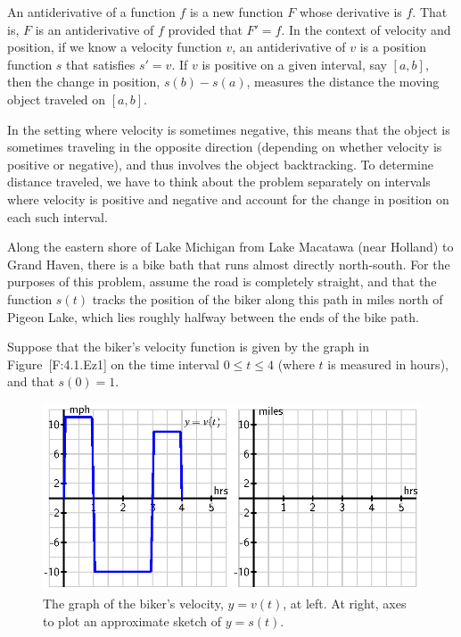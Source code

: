 An antiderivative of a function \(f\) is a new function \(F\) whose
derivative is \(f\). That is, \(F\) is an antiderivative of \(f\)
provided that \(F' = f\). In the context of velocity and position, if we
know a velocity function \(v\), an antiderivative of \(v\) is a position
function \(s\) that satisfies \(s' = v\). If \(v\) is positive on a
given interval, say \([a,b]\), then the change in position,
\(s(b) - s(a)\), measures the distance the moving object traveled on
\([a,b]\).

In the setting where velocity is sometimes negative, this means that the
object is sometimes traveling in the opposite direction (depending on
whether velocity is positive or negative), and thus involves the object
backtracking. To determine distance traveled, we have to think about the
problem separately on intervals where velocity is positive and negative
and account for the change in position on each such interval.

Along the eastern shore of Lake Michigan from Lake Macatawa (near
Holland) to Grand Haven, there is a bike bath that runs almost directly
north-south. For the purposes of this problem, assume the road is
completely straight, and that the function \(s(t)\) tracks the position
of the biker along this path in miles north of Pigeon Lake, which lies
roughly halfway between the ends of the bike path.

Suppose that the biker's velocity function is given by the graph in
Figure~{[}F:4.1.Ez1{]} on the time interval \(0 \le t \le 4\) (where
\(t\) is measured in hours), and that \(s(0) = 1\).

\begin{figure}[htbp]
\centering
\includegraphics{figures/4_1_Ez1.eps}
\caption{The graph of the biker's velocity, \(y = v(t)\), at left. At
right, axes to plot an approximate sketch of \(y = s(t)\).{}}
\end{figure}

